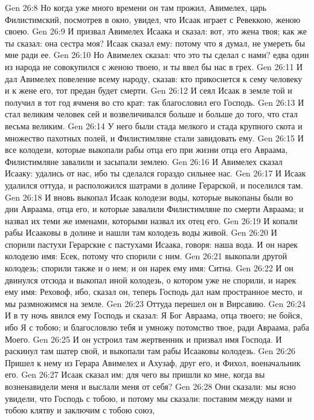 Gen 26:8  Но когда уже много времени он там прожил, Авимелех, царь Филистимский, посмотрев в окно, увидел, что Исаак играет с Ревеккою, женою своею.
Gen 26:9  И призвал Авимелех Исаака и сказал: вот, это жена твоя; как же ты сказал: она сестра моя? Исаак сказал ему: потому что я думал, не умереть бы мне ради ее.
Gen 26:10  Но Авимелех сказал: что это ты сделал с нами? едва один из народа не совокупился с женою твоею, и ты ввел бы нас в грех.
Gen 26:11  И дал Авимелех повеление всему народу, сказав: кто прикоснется к сему человеку и к жене его, тот предан будет смерти.
Gen 26:12  И сеял Исаак в земле той и получил в тот год ячменя во сто крат: так благословил его Господь.
Gen 26:13  И стал великим человек сей и возвеличивался больше и больше до того, что стал весьма великим.
Gen 26:14  У него были стада мелкого и стада крупного скота и множество пахотных полей, и Филистимляне стали завидовать ему.
Gen 26:15  И все колодези, которые выкопали рабы отца его при жизни отца его Авраама, Филистимляне завалили и засыпали землею.
Gen 26:16  И Авимелех сказал Исааку: удались от нас, ибо ты сделался гораздо сильнее нас.
Gen 26:17  И Исаак удалился оттуда, и расположился шатрами в долине Герарской, и поселился там.
Gen 26:18  И вновь выкопал Исаак колодези воды, которые выкопаны были во дни Авраама, отца его, и которые завалили Филистимляне по смерти Авраама; и назвал их теми же именами, которыми назвал их отец его.
Gen 26:19  И копали рабы Исааковы в долине и нашли там колодезь воды живой.
Gen 26:20  И спорили пастухи Герарские с пастухами Исаака, говоря: наша вода. И он нарек колодезю имя: Есек, потому что спорили с ним.
Gen 26:21  выкопали другой колодезь; спорили также и о нем; и он нарек ему имя: Ситна.
Gen 26:22  И он двинулся отсюда и выкопал иной колодезь, о котором уже не спорили, и нарек ему имя: Реховоф, ибо, сказал он, теперь Господь дал нам пространное место, и мы размножимся на земле.
Gen 26:23  Оттуда перешел он в Вирсавию.
Gen 26:24  И в ту ночь явился ему Господь и сказал: Я Бог Авраама, отца твоего; не бойся, ибо Я с тобою; и благословлю тебя и умножу потомство твое, ради Авраама, раба Моего.
Gen 26:25  И он устроил там жертвенник и призвал имя Господа. И раскинул там шатер свой, и выкопали там рабы Исааковы колодезь.
Gen 26:26  Пришел к нему из Герара Авимелех и Ахузаф, друг его, и Фихол, военачальник его.
Gen 26:27  Исаак сказал им: для чего вы пришли ко мне, когда вы возненавидели меня и выслали меня от себя?
Gen 26:28  Они сказали: мы ясно увидели, что Господь с тобою, и потому мы сказали: поставим между нами и тобою клятву и заключим с тобою союз,
